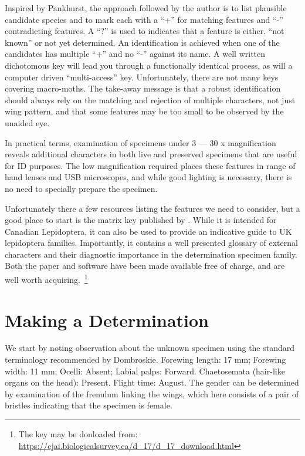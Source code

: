 \documentclass[]{article}
\begin{document}
 Inspired by Pankhurst, the approach followed by the author is to list plausible candidate species and to mark each with a \enquote{+} for matching features and \enquote{-} contradicting features. A \enquote{?} is used to  indicates that a feature is either. \enquote{not known} or not yet determined. An identification is achieved when one of the candidates has multiple \enquote{+} and no \enquote{-} against its name.
 A well written dichotomous key will lead you through a functionally identical process, as will a computer driven \enquote{multi-access} key. Unfortunately, there are not many keys covering macro-moths.
 The take-away message is that a robust identification should always rely on the matching and rejection of multiple characters, not just wing pattern, and that some features  may be too small to be observed by the unaided eye.  
 
 In practical terms,  examination of specimens under  3 --- 30 x magnification reveals additional characters  in both live and preserved specimens that are useful for ID purposes. The low magnification required places these features in range of hand lenses and USB microscopes, and while good lighting is necessary, there is no need to specially prepare the specimen.
 
 Unfortunately there a few resources listing the features we need to consider, but a good place to start is the matrix key published by \cite{Dombroskie2011}. While it is intended for Canadian Lepidoptera, it can also be used to provide an indicative guide to UK lepidoptera families. Importantly, it contains a well presented glossary of external characters and their diagnostic importance in the determination specimen family. Both the paper and software have been made available free of charge, and are well worth acquiring.~\footnote{ The key may be donloaded from: \url{https://cjai.biologicalsurvey.ca/d_17/d_17_download.html}}
 
\section*{Making a Determination}
We start by noting observation about the unknown specimen using the standard terminology recommended by Dombroskie.
Forewing length: 17 mm; Forewing width: 11 mm;  Ocelli: Absent;  Labial palps: Forward. Chaetosemata (hair-like organs on the head):  Present. Flight time: August. The gender can be determined by examination of the frenulum linking the wings, which here consists of a pair of bristles indicating that the specimen is female.
\end{document}
